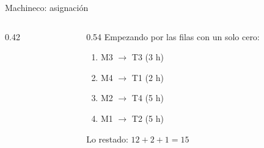 \documentclass[aspectratio=169]{beamer}
\newcommand{\marco}[3]{%
  \foreach \i in {2,...,#2} \foreach \j in {2,...,#3}
    \draw[gray!60, very thin] (#1-\i-\j.north west) rectangle (#1-\i-\j.south east);
  \draw[semithick] (#1-2-2.north west) rectangle (#1-#2-#3.south east);}
\newcommand{\cero}[1]{\node[asig] at (#1) {};}
\newcommand{\pie}[2]{\node[below=1.5mm of #1, font=\scriptsize\itshape] {#2};}
\begin{document}
\begin{frame}[fragile]{Machineco: asignación}
  \begin{columns}[c]
    \begin{column}{0.42\textwidth}
      \centering
    \end{column}
    \begin{column}{0.54\textwidth}
      Empezando por las filas con un solo cero:
      \begin{enumerate}
        \item M3 $\to$ T3 \quad (3 h)
        \item M4 $\to$ T1 \quad (2 h)
        \item M2 $\to$ T4 \quad (5 h)
        \item M1 $\to$ T2 \quad (5 h)
      \end{enumerate}
      \medskip

      \medskip
      {\small Lo restado: $12 + 2 + 1 = 15$ \checkmark}
    \end{column}
  \end{columns}
\end{frame}
\end{document}
